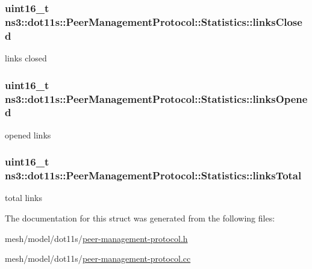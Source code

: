 \subsubsection[{\texorpdfstring{links\+Closed}{linksClosed}}]{\setlength{\rightskip}{0pt plus 5cm}uint16\+\_\+t ns3\+::dot11s\+::\+Peer\+Management\+Protocol\+::\+Statistics\+::links\+Closed}\hypertarget{structns3_1_1dot11s_1_1PeerManagementProtocol_1_1Statistics_a67955b1a6a6244fee5abc172fdec993a}{}\label{structns3_1_1dot11s_1_1PeerManagementProtocol_1_1Statistics_a67955b1a6a6244fee5abc172fdec993a}


links closed 

\subsubsection[{\texorpdfstring{links\+Opened}{linksOpened}}]{\setlength{\rightskip}{0pt plus 5cm}uint16\+\_\+t ns3\+::dot11s\+::\+Peer\+Management\+Protocol\+::\+Statistics\+::links\+Opened}\hypertarget{structns3_1_1dot11s_1_1PeerManagementProtocol_1_1Statistics_a54d8ebeb0b661313ce2b1f38e6e09af7}{}\label{structns3_1_1dot11s_1_1PeerManagementProtocol_1_1Statistics_a54d8ebeb0b661313ce2b1f38e6e09af7}


opened links 

\subsubsection[{\texorpdfstring{links\+Total}{linksTotal}}]{\setlength{\rightskip}{0pt plus 5cm}uint16\+\_\+t ns3\+::dot11s\+::\+Peer\+Management\+Protocol\+::\+Statistics\+::links\+Total}\hypertarget{structns3_1_1dot11s_1_1PeerManagementProtocol_1_1Statistics_a3b84cc20726376c412f76312dc5dd7ee}{}\label{structns3_1_1dot11s_1_1PeerManagementProtocol_1_1Statistics_a3b84cc20726376c412f76312dc5dd7ee}


total links 



The documentation for this struct was generated from the following files\+:\begin{DoxyCompactItemize}
\item 
mesh/model/dot11s/\hyperlink{peer-management-protocol_8h}{peer-\/management-\/protocol.\+h}\item 
mesh/model/dot11s/\hyperlink{peer-management-protocol_8cc}{peer-\/management-\/protocol.\+cc}\end{DoxyCompactItemize}
